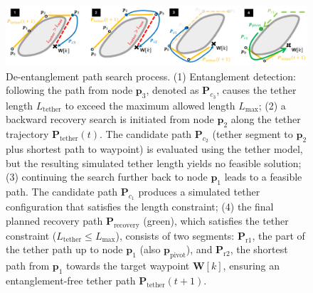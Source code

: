 \begin{figure}[h]
    \centering
    \includegraphics[width=\textwidth]{EA-Planner/figures/planner_newest.pdf}
    \caption{De-entanglement path search process. 
    (1) Entanglement detection: following the path from node \( \mathbf{p}_3 \), denoted as \( \mathbf{P}_{c_3} \), causes the tether length \( L_{\text{tether}} \) to exceed the maximum allowed length \( L_{\text{max}} \); 
    (2) a backward recovery search is initiated from node \( \mathbf{p}_2 \) along the tether trajectory \( \mathbf{P}_{\mathrm{tether}}(t) \). The candidate path \( \mathbf{P}_{c_2} \) (tether segment to \( \mathbf{p}_2 \) plus shortest path to waypoint) is evaluated using the tether model, but the resulting simulated tether length yields no feasible solution; 
    (3) continuing the search further back to node \( \mathbf{p}_1 \) leads to a feasible path. The candidate path \( \mathbf{P}_{c_1} \) produces a simulated tether configuration that satisfies the length constraint; 
    (4) the final planned recovery path \( \mathbf{P}_{\text{recovery}} \) (green), which satisfies the tether constraint (\( L_{\text{tether}} \leq L_{\text{max}} \)), consists of two segments: \( \mathbf{P}_{\text{r}1} \), the part of the tether path up to node \( \mathbf{p}_1 \) (also \( \mathbf{p}_{\text{pivot}} \)), and \( \mathbf{P}_{\text{r}2} \), the shortest path from \( \mathbf{p}_1 \) towards the target waypoint \( \mathbf{W}[k] \), ensuring an entanglement-free tether path $\mathbf{P}_{\mathrm{tether}}(t+1)$.}
    \label{fig:planner_search}
\end{figure}



